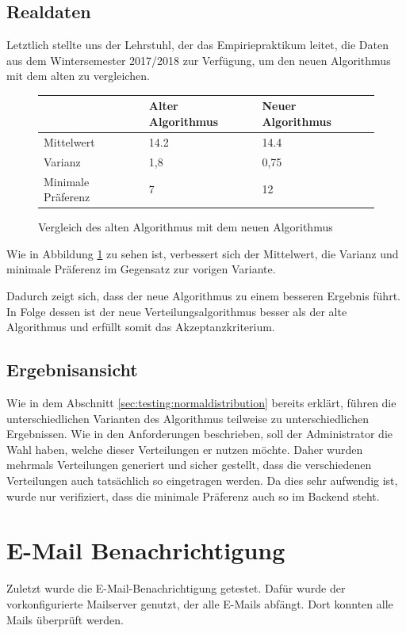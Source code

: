 		\subsection{Realdaten}
		
			Letztlich stellte uns der Lehrstuhl, der das Empiriepraktikum leitet, die Daten aus dem Wintersemester 2017/2018 zur Verfügung, um den neuen Algorithmus mit dem alten zu vergleichen.\newline
			
			\begin{figure}
				\centering
				\begin{tabular}{l|l|l}
					& Alter Algorithmus & Neuer Algorithmus \\
					\hline
					Mittelwert & 14.2 & 14.4 \\
					Varianz & 1,8 & 0,75 \\
					Minimale Präferenz & 7 & 12 \\
				\end{tabular}
				\caption{Vergleich des alten Algorithmus mit dem neuen Algorithmus}
				\label{tab:old_versus_new_algorithm}
			\end{figure}
		
			Wie in Abbildung \ref{tab:old_versus_new_algorithm} zu sehen ist, verbessert sich der Mittelwert, die Varianz und minimale Präferenz im Gegensatz zur vorigen Variante.\newline
			
			Dadurch zeigt sich, dass der neue Algorithmus zu einem besseren Ergebnis führt.
			In Folge dessen ist der neue Verteilungsalgorithmus besser als der alte Algorithmus und erfüllt somit das Akzeptanzkriterium.
			
		\subsection{Ergebnisansicht}
			
			Wie in dem Abschnitt \ref{sec:testing:normaldistribution} bereits erklärt, führen die unterschiedlichen Varianten des Algorithmus teilweise zu unterschiedlichen Ergebnissen.
			Wie in den Anforderungen beschrieben, soll der Administrator die Wahl haben, welche dieser Verteilungen er nutzen möchte.
			Daher wurden mehrmals Verteilungen generiert und sicher gestellt, dass die verschiedenen Verteilungen auch tatsächlich so eingetragen werden.
			Da dies sehr aufwendig ist, wurde nur verifiziert, dass die minimale Präferenz auch so im Backend steht.
		
	\section{E-Mail Benachrichtigung}
		Zuletzt wurde die E-Mail-Benachrichtigung getestet.
		Dafür wurde der vorkonfigurierte Mailserver genutzt, der alle E-Mails abfängt.
		Dort konnten alle Mails überprüft werden.
		
		
		
		
		
		
		
		
		
		
		
		
		
		
		
		
		
		
		
		
		
		
		
		
		
